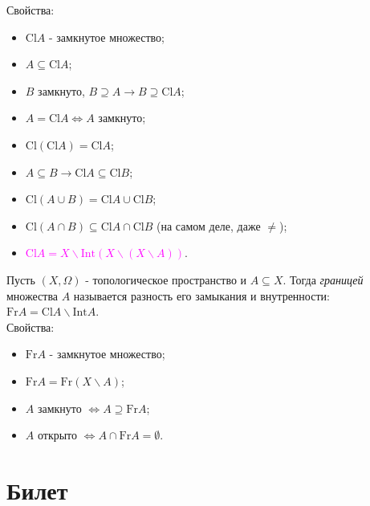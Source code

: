 \documentclass[a4paper,100pt]{article}
\theoremstyle{indented}
\begin{document}
Свойства:
\begin{itemize}
    
    \item $\text{Cl}A$ - замкнутое множество;
    \item $A\subseteq \text{Cl}A$;
    \item $B$ замкнуто, $B\supseteq A \rightarrow B \supseteq \text{Cl}A$;
    \item $A = \text{Cl}A \Leftrightarrow A$ замкнуто;
    \item $\text{Cl}(\text{Cl}A)=\text{Cl}A$;
    \item $A\subseteq B \rightarrow \text{Cl}A\subseteq \text{Cl}B$;
    \item $\text{Cl}(A\cup B)=\text{Cl}A\cup \text{Cl}B$;
    \item $\text{Cl}(A\cap B)\subseteq \text{Cl}A\cap\text{Cl}B $ (на самом деле, даже $\neq$);
    \item \textcolor{magenta}{$\text{Cl}A=X\backslash \text{Int}(X\backslash(X\backslash A))$}.

\end{itemize}

Пусть $(X, \Omega)$ - топологическое пространство и $A\subseteq X$. Тогда \textit{границей} множества $A$ называется разность его замыкания и внутренности: $\text{Fr}A = \text{Cl}A\backslash \text{Int}A$. \\

Свойства:
\begin{itemize}

    \item $\text{Fr} A$ - замкнутое множество;
    \item $\text{Fr} A = \text{Fr}(X\backslash A)$;
    \item $A$ замкнуто $\Leftrightarrow A \supseteq \text{Fr} A$;
    \item $A$ открыто $\Leftrightarrow A \cap \text{Fr} A = \emptyset$.

\end{itemize}

\section{Билет} \

\medskip
\end{document}
